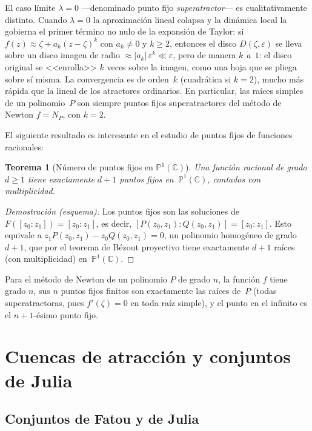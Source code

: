 \documentclass[11pt,a4paper]{article}
\theoremstyle{plain}
\newtheorem{teorema}{Teorema}[section]
\theoremstyle{definition}
\theoremstyle{remark}
\newcommand{\Puno}{\mathbb{P}^1(\mathbb{C})}
\begin{document}
El caso límite $\lambda=0$ —denominado punto fijo \emph{superatractor}— es cualitativamente distinto.
Cuando $\lambda=0$ la aproximación lineal colapsa y la dinámica local
la gobierna el primer término no nulo de la expansión de Taylor:
si $f(z)\approx\zeta+a_k(z-\zeta)^k$ con $a_k\neq 0$ y $k\geq 2$,
entonces el disco $D(\zeta,\varepsilon)$ se lleva sobre un disco imagen de
radio $\approx|a_k|\,\varepsilon^k\ll\varepsilon$, pero de manera \emph{$k$ a~$1$}:
el disco original se <<enrolla>> $k$ veces sobre la imagen,
como una hoja que se pliega sobre sí misma.
La convergencia es de orden~$k$ (cuadrática si $k=2$), mucho más rápida
que la lineal de los atractores ordinarios.
En particular, las raíces simples de un polinomio~$P$ son siempre puntos
fijos superatractores del método de Newton $f=N_P$, con $k=2$.



El siguiente resultado es interesante en el estudio de puntos fijos de funciones racionales:

\begin{teorema}[Número  de puntos fijos en $\Puno$]
\label{teo:puntosfijos}
Una función racional de grado $d\geq 1$ tiene exactamente $d+1$
puntos fijos en~$\Puno$, contados con multiplicidad.
\end{teorema}

\begin{proof}[Demostración (esquema)]
Los puntos fijos son las soluciones de $F([z_0:z_1])=[z_0:z_1]$,
es decir, $[P(z_0,z_1):Q(z_0,z_1)]=[z_0:z_1]$.
Esto equivale a $z_1 P(z_0,z_1)-z_0 Q(z_0,z_1)=0$, un polinomio
homogéneo de grado $d+1$, que por el teorema de Bézout proyectivo
tiene exactamente $d+1$ raíces (con multiplicidad) en~$\Puno$.
\end{proof}

Para el método de Newton de un polinomio $P$ de grado $n$, la función
$f$ tiene grado $n$, sus $n$ puntos fijos finitos son exactamente
las raíces de~$P$ (todas superatractoras, pues $f'(\zeta)=0$ en toda
raíz simple), y el punto en el infinito es el $n+1$-ésimo punto fijo.

\section{Cuencas de atracción y conjuntos de Julia}
\label{sec:cuencas}

\subsection{Conjuntos de Fatou y de Julia}
\label{ssec:julia}
\end{document}
